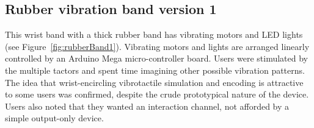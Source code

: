 \documentclass{chi-ext}
\begin{document}
\subsection{Rubber vibration band version 1}
This wrist band with a thick rubber band has vibrating motors and LED lights (see Figure~\ref{fig:rubberBand1}). Vibrating motors and lights are arranged linearly controlled by an Arduino Mega micro-controller board. Users were stimulated by the multiple tactors and spent time imagining other possible vibration patterns. The idea that wrist-encircling vibrotactile simulation and encoding is attractive to some users was confirmed, despite the crude prototypical nature of the device. Users also noted that they wanted an interaction channel, not afforded by a simple output-only device. 


\end{document}
